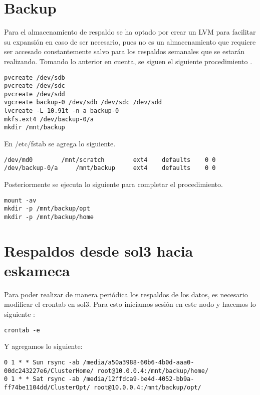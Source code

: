 \section{Backup}
Para el almacenamiento de respaldo se ha optado por crear un LVM para facilitar su expansión en caso de ser necesario, pues no es un almacenamiento que requiere ser accesado constantemente salvo para los respaldos semanales que se estarán realizando. Tomando lo anterior en cuenta, se siguen el siguiente procedimiento \cite{lvm-dummies}.

\begin{lstlisting}
pvcreate /dev/sdb
pvcreate /dev/sdc
pvcreate /dev/sdd
vgcreate backup-0 /dev/sdb /dev/sdc /dev/sdd
lvcreate -L 10.91t -n a backup-0
mkfs.ext4 /dev/backup-0/a
mkdir /mnt/backup
\end{lstlisting}

En /etc/fstab se agrega lo siguiente.

\begin{lstlisting}
/dev/md0		/mnt/scratch 		ext4 	defaults 	0 0
/dev/backup-0/a		/mnt/backup		ext4	defaults	0 0
\end{lstlisting}

Posteriormente  se ejecuta lo siguiente para completar el procedimiento.

\begin{lstlisting}
mount -av
mkdir -p /mnt/backup/opt
mkdir -p /mnt/backup/home
\end{lstlisting}

\section{Respaldos desde sol3 hacia eskameca}
Para poder realizar de manera periódica los respaldos de los datos, es necesario modificar el crontab en sol3. Para esto iniciamos sesión en este nodo y hacemos lo siguiente \cite{crontab}:

\begin{lstlisting}
crontab -e
\end{lstlisting}

Y agregamos lo siguiente:

\begin{lstlisting}
0 1 * * Sun rsync -ab /media/a50a3988-60b6-4b0d-aaa0-00dc243227e6/ClusterHome/ root@10.0.0.4:/mnt/backup/home/
0 1 * * Sat rsync -ab /media/12ffdca9-be4d-4052-bb9a-ff74be1104dd/ClusterOpt/ root@10.0.0.4:/mnt/backup/opt/
\end{lstlisting}

